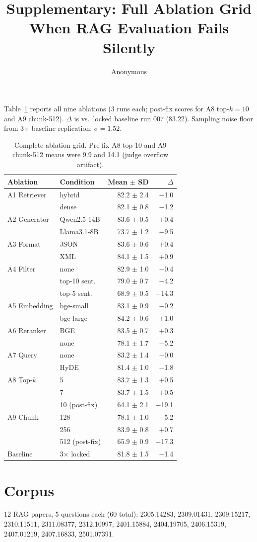 \documentclass[11pt]{article}
\title{Supplementary: Full Ablation Grid\\\large When RAG Evaluation Fails Silently}
\author{Anonymous}
\date{}
\begin{document}
\maketitle

Table~\ref{tab:full} reports all nine ablations (3 runs each; post-fix scores for A8 top-$k{=}10$ and A9 chunk-512).
$\Delta$ is vs.\ locked baseline run 007 (83.22).
Sampling noise floor from 3$\times$ baseline replication: $\sigma{=}1.52$.

\begin{table}[h]
  \centering
  \small
  \begin{tabular}{llrr}
    \toprule
    \textbf{Ablation} & \textbf{Condition} & \textbf{Mean $\pm$ SD} & \textbf{$\Delta$} \\
    \midrule
    A1 Retriever & hybrid & 82.2 $\pm$ 2.4 & $-$1.0 \\
                 & dense  & 82.1 $\pm$ 0.8 & $-$1.2 \\
    A2 Generator & Qwen2.5-14B & 83.6 $\pm$ 0.5 & $+$0.4 \\
                 & Llama3.1-8B & 73.7 $\pm$ 1.2 & $-$9.5 \\
    A3 Format    & JSON & 83.6 $\pm$ 0.6 & $+$0.4 \\
                 & XML  & 84.1 $\pm$ 1.5 & $+$0.9 \\
    A4 Filter    & none & 82.9 $\pm$ 1.0 & $-$0.4 \\
                 & top-10 sent. & 79.0 $\pm$ 0.7 & $-$4.2 \\
                 & top-5 sent.  & 68.9 $\pm$ 0.5 & $-$14.3 \\
    A5 Embedding & bge-small & 83.1 $\pm$ 0.9 & $-$0.2 \\
                 & bge-large & 84.2 $\pm$ 0.6 & $+$1.0 \\
    A6 Reranker  & BGE & 83.5 $\pm$ 0.7 & $+$0.3 \\
                 & none & 78.1 $\pm$ 1.7 & $-$5.2 \\
    A7 Query     & none & 83.2 $\pm$ 1.4 & $-$0.0 \\
                 & HyDE & 81.4 $\pm$ 1.0 & $-$1.8 \\
    A8 Top-$k$   & 5  & 83.7 $\pm$ 1.3 & $+$0.5 \\
                 & 7  & 83.7 $\pm$ 1.5 & $+$0.5 \\
                 & 10 (post-fix) & 64.1 $\pm$ 2.1 & $-$19.1 \\
    A9 Chunk     & 128 & 78.1 $\pm$ 1.0 & $-$5.2 \\
                 & 256 & 83.9 $\pm$ 0.8 & $+$0.7 \\
                 & 512 (post-fix) & 65.9 $\pm$ 0.9 & $-$17.3 \\
    Baseline     & 3$\times$ locked & 81.8 $\pm$ 1.5 & $-$1.4 \\
    \bottomrule
  \end{tabular}
  \caption{Complete ablation grid. Pre-fix A8 top-10 and A9 chunk-512 means were 9.9 and 14.1 (judge overflow artifact).}
  \label{tab:full}
\end{table}

\section*{Corpus}

12 RAG papers, 5 questions each (60 total): 2305.14283, 2309.01431, 2309.15217, 2310.11511, 2311.08377, 2312.10997, 2401.15884, 2404.19705, 2406.15319, 2407.01219, 2407.16833, 2501.07391.
\end{document}
